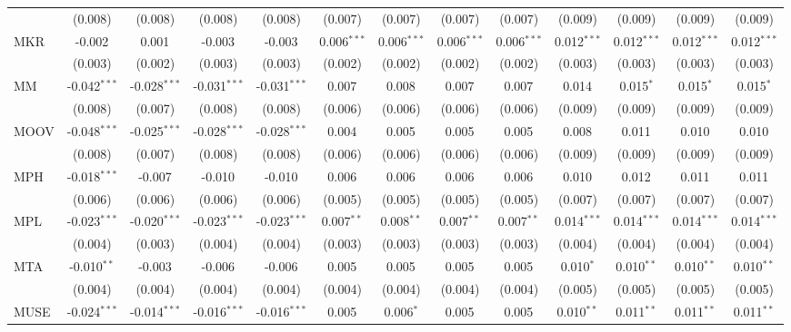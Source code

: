 \begin{table}[!htbp]
\begin{tabular}{@{\extracolsep{5pt}}lcccccccccccc}
  & (0.008) & (0.008) & (0.008) & (0.008) & (0.007) & (0.007) & (0.007) & (0.007) & (0.009) & (0.009) & (0.009) & (0.009) \\
 MKR & -0.002$^{}$ & 0.001$^{}$ & -0.003$^{}$ & -0.003$^{}$ & 0.006$^{***}$ & 0.006$^{***}$ & 0.006$^{***}$ & 0.006$^{***}$ & 0.012$^{***}$ & 0.012$^{***}$ & 0.012$^{***}$ & 0.012$^{***}$ \\
  & (0.003) & (0.002) & (0.003) & (0.003) & (0.002) & (0.002) & (0.002) & (0.002) & (0.003) & (0.003) & (0.003) & (0.003) \\
 MM & -0.042$^{***}$ & -0.028$^{***}$ & -0.031$^{***}$ & -0.031$^{***}$ & 0.007$^{}$ & 0.008$^{}$ & 0.007$^{}$ & 0.007$^{}$ & 0.014$^{}$ & 0.015$^{*}$ & 0.015$^{*}$ & 0.015$^{*}$ \\
  & (0.008) & (0.007) & (0.008) & (0.008) & (0.006) & (0.006) & (0.006) & (0.006) & (0.009) & (0.009) & (0.009) & (0.009) \\
 MOOV & -0.048$^{***}$ & -0.025$^{***}$ & -0.028$^{***}$ & -0.028$^{***}$ & 0.004$^{}$ & 0.005$^{}$ & 0.005$^{}$ & 0.005$^{}$ & 0.008$^{}$ & 0.011$^{}$ & 0.010$^{}$ & 0.010$^{}$ \\
  & (0.008) & (0.007) & (0.008) & (0.008) & (0.006) & (0.006) & (0.006) & (0.006) & (0.009) & (0.009) & (0.009) & (0.009) \\
 MPH & -0.018$^{***}$ & -0.007$^{}$ & -0.010$^{}$ & -0.010$^{}$ & 0.006$^{}$ & 0.006$^{}$ & 0.006$^{}$ & 0.006$^{}$ & 0.010$^{}$ & 0.012$^{}$ & 0.011$^{}$ & 0.011$^{}$ \\
  & (0.006) & (0.006) & (0.006) & (0.006) & (0.005) & (0.005) & (0.005) & (0.005) & (0.007) & (0.007) & (0.007) & (0.007) \\
 MPL & -0.023$^{***}$ & -0.020$^{***}$ & -0.023$^{***}$ & -0.023$^{***}$ & 0.007$^{**}$ & 0.008$^{**}$ & 0.007$^{**}$ & 0.007$^{**}$ & 0.014$^{***}$ & 0.014$^{***}$ & 0.014$^{***}$ & 0.014$^{***}$ \\
  & (0.004) & (0.003) & (0.004) & (0.004) & (0.003) & (0.003) & (0.003) & (0.003) & (0.004) & (0.004) & (0.004) & (0.004) \\
 MTA & -0.010$^{**}$ & -0.003$^{}$ & -0.006$^{}$ & -0.006$^{}$ & 0.005$^{}$ & 0.005$^{}$ & 0.005$^{}$ & 0.005$^{}$ & 0.010$^{*}$ & 0.010$^{**}$ & 0.010$^{**}$ & 0.010$^{**}$ \\
  & (0.004) & (0.004) & (0.004) & (0.004) & (0.004) & (0.004) & (0.004) & (0.004) & (0.005) & (0.005) & (0.005) & (0.005) \\
 MUSE & -0.024$^{***}$ & -0.014$^{***}$ & -0.016$^{***}$ & -0.016$^{***}$ & 0.005$^{}$ & 0.006$^{*}$ & 0.005$^{}$ & 0.005$^{}$ & 0.010$^{**}$ & 0.011$^{**}$ & 0.011$^{**}$ & 0.011$^{**}$ \\

\end{tabular}
\end{table}
